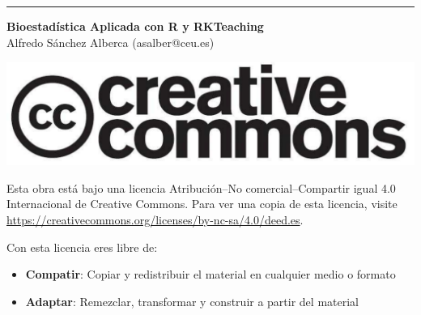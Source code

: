 \thispagestyle{empty}
\null
\vfill
\hrule depth 3pt
\smallskip
\sffamily

\noindent \textbf{Bioestadística Aplicada con R y RKTeaching}\\
Alfredo Sánchez Alberca (asalber@ceu.es) 

\bigskip
\begin{center}
\includegraphics[scale=0.1]{img/cc-logo}
\end{center}

\medskip

\small
Esta obra está bajo una licencia Atribución--No comercial--Compartir igual 4.0 Internacional de Creative Commons.
Para ver una copia de esta licencia, visite \url{https://creativecommons.org/licenses/by-nc-sa/4.0/deed.es}.

\medskip
Con esta licencia eres libre de:
\begin{itemize}
\item \textbf{Compatir}: Copiar y redistribuir el material en cualquier medio o formato 
\item \textbf{Adaptar}: Remezclar, transformar y construir a partir del material 
\end{itemize}

